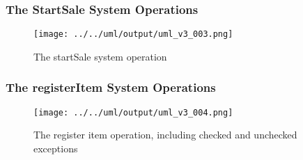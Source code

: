 \documentclass[a4paper]{scrreprt}
\begin{document}
%
%
%
\subsubsection*{The StartSale System Operations}
\begin{figure}[h!]
    \begin{center}
        \texttt{[image: ../../uml/output/uml\_v3\_003.png]}
        \caption{The startSale system operation }
        \label{fig:SD}
    \end{center}
\end{figure}
\subsubsection*{The registerItem System Operations}
\begin{figure}[h!]
    \begin{center}
        \texttt{[image: ../../uml/output/uml\_v3\_004.png]}
        \caption{The register item operation, including checked and unchecked exceptions}
        \label{fig:reg-item}
    \end{center}
\end{figure}
\end{document}
